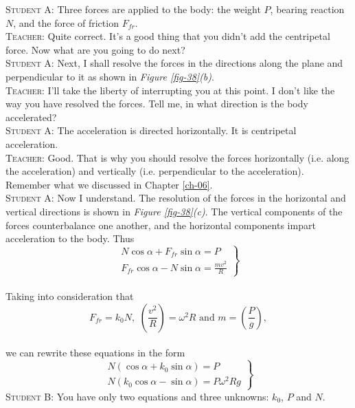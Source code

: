 \documentclass[a4paper,sfsidenotes]{tufte-book}
\begin{document}
\textsc{Student A:} Three forces are applied to the body: the weight $P$, bearing reaction $N$, and the force of friction $F_{fr}$.
\\
\textsc{Teacher:} Quite correct. It's a good thing that you didn't add the centripetal force. Now what are you going to do next?
\\
\textsc{Student A:} Next, I shall resolve the forces in the directions along the plane and perpendicular to it as shown in \emph{Figure \ref{fig-38}(b)}.
\\
\textsc{Teacher:} I'll take the liberty of interrupting you at this point. I don't like the way you have resolved the forces. Tell me, in what direction is the body accelerated?
\\
\textsc{Student A:} The acceleration is directed horizontally. It is centripetal acceleration.
\\
\textsc{Teacher:} Good. That is why you should resolve the forces horizontally (i.e. along the acceleration) and vertically (i.e. perpendicular to the acceleration). Remember what we discussed in  Chapter \ref{ch-06}.
\\
\textsc{Student A:} Now I understand. The resolution of the forces in the horizontal and vertical directions is shown in \emph{Figure \ref{fig-38}(c)}. The vertical components of the forces counterbalance one another, and the horizontal components impart acceleration to the body. Thus
\begin{equation*}
\left.
\begin{aligned}
N \cos \alpha + F_{fr} \sin \alpha = P \\
F_{fr} \cos \alpha -N \sin \alpha = \frac{mv^{2}}{R}
\end{aligned}
\right\}
\end{equation*}
\\
Taking into consideration that 
\begin{equation*}
F_{fr}=k_{0}N, \, \, \left( \frac{v^{2}}{R} \right)=\omega^{2}R \, \, \text{and} \, \, m=\left(\frac{P}{g} \right),
\end{equation*}
\\
we can rewrite these equations in the form
\begin{equation*}
\left.
\begin{aligned}
N (\cos \alpha + k_{0} \sin \alpha)=P \\
N(k_{0} \cos \alpha -\sin \alpha)=P \omega^{2} Rg
\end{aligned}
\right\}
\end{equation*}
\textsc{Student B:} You have only two equations and three unknowns: $k_{0}$, $P$ and $N$.
\end{document}
